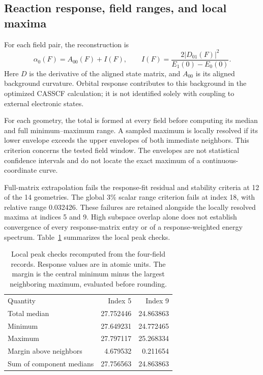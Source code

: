 \documentclass[aip,jcp,amsmath,amssymb,preprint,floatfix]{revtex4-1}
\begin{document}
\subsection{Reaction response, field ranges, and local maxima}
For each field pair, the reconstruction is
\begin{equation}
\alpha_0(F)=A_{00}(F)+I(F),\qquad
I(F)=\frac{2|D_{01}(F)|^2}{E_1(0)-E_0(0)}.
\end{equation}
Here $D$ is the derivative of the aligned state matrix, and $A_{00}$ is
its aligned background curvature. Orbital response contributes to this
background in the optimized CASSCF calculation; it is not identified
solely with coupling to external electronic states.

For each geometry, the total is formed at every field before computing
its median and full minimum--maximum range. A sampled maximum is locally
resolved if its lower envelope exceeds the upper envelopes of both
immediate neighbors. This criterion concerns the tested field window.
The envelopes are not statistical confidence intervals and do not locate
the exact maximum of a continuous-coordinate curve.

Full-matrix extrapolation fails the response-fit residual and stability
criteria at 12 of the 14 geometries. The global 3\% scalar range criterion
fails at index 18, with relative range 0.032426. These failures are retained
alongside the locally resolved maxima at indices 5 and 9. High subspace
overlap alone does not establish convergence of every response-matrix
entry or of a response-weighted energy spectrum. Table~\ref{tab:peaks} summarizes the local peak checks.

\begin{table}[ht]
\caption{Local peak checks recomputed from the four-field records. Response
values are in atomic units. The margin is the central minimum minus the
largest neighboring maximum, evaluated before rounding.}\label{tab:peaks}
\begin{ruledtabular}\begin{tabular}{lrr}
Quantity & Index 5 & Index 9\\
Total median &27.752446&24.863863\\
Minimum &27.649231&24.772465\\
Maximum &27.797117&25.268334\\
Margin above neighbors&4.679532&0.211654\\
Sum of component medians&27.756563&24.863863
\end{tabular}\end{ruledtabular}
\end{table}
\end{document}
